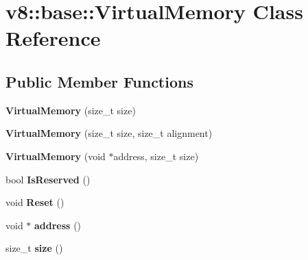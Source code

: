 \hypertarget{classv8_1_1base_1_1_virtual_memory}{}\section{v8\+:\+:base\+:\+:Virtual\+Memory Class Reference}
\label{classv8_1_1base_1_1_virtual_memory}
\subsection*{Public Member Functions}
\begin{DoxyCompactItemize}
\item 
{\bfseries Virtual\+Memory} (size\+\_\+t size)\hypertarget{classv8_1_1base_1_1_virtual_memory_ab3da8b6a97413baa2636b107a9de25a3}{}\label{classv8_1_1base_1_1_virtual_memory_ab3da8b6a97413baa2636b107a9de25a3}

\item 
{\bfseries Virtual\+Memory} (size\+\_\+t size, size\+\_\+t alignment)\hypertarget{classv8_1_1base_1_1_virtual_memory_a3bd98533c11f0aae7bd35220b9156c03}{}\label{classv8_1_1base_1_1_virtual_memory_a3bd98533c11f0aae7bd35220b9156c03}

\item 
{\bfseries Virtual\+Memory} (void $\ast$address, size\+\_\+t size)\hypertarget{classv8_1_1base_1_1_virtual_memory_a21c8bbb7d15aa6d16e957ba2cf28f2fb}{}\label{classv8_1_1base_1_1_virtual_memory_a21c8bbb7d15aa6d16e957ba2cf28f2fb}

\item 
bool {\bfseries Is\+Reserved} ()\hypertarget{classv8_1_1base_1_1_virtual_memory_af3e0358153b9f4ddd219f1dc60b211bb}{}\label{classv8_1_1base_1_1_virtual_memory_af3e0358153b9f4ddd219f1dc60b211bb}

\item 
void {\bfseries Reset} ()\hypertarget{classv8_1_1base_1_1_virtual_memory_a2af8127a0aa0c8259bd3f09b39154435}{}\label{classv8_1_1base_1_1_virtual_memory_a2af8127a0aa0c8259bd3f09b39154435}

\item 
void $\ast$ {\bfseries address} ()\hypertarget{classv8_1_1base_1_1_virtual_memory_a23ecde377f0a09536009b51034b321f3}{}\label{classv8_1_1base_1_1_virtual_memory_a23ecde377f0a09536009b51034b321f3}

\item 
size\+\_\+t {\bfseries size} ()\hypertarget{classv8_1_1base_1_1_virtual_memory_a967175490dbb7d11c242b509f5731e4b}{}\label{classv8_1_1base_1_1_virtual_memory_a967175490dbb7d11c242b509f5731e4b}


\end{DoxyCompactItemize}

